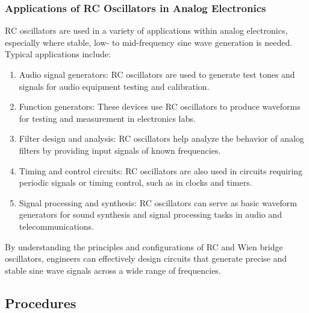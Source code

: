 \documentclass[12pt,a4paper]{article}
\begin{document}
    \subsubsection{Applications of RC Oscillators in Analog Electronics}
    RC oscillators are used in a variety of applications within analog electronics, especially where stable, low- to mid-frequency sine wave generation is needed. Typical applications include:

    \begin{enumerate}
        \item Audio signal generators: RC oscillators are used to generate test tones and signals for audio equipment testing and calibration.
        \item Function generators: These devices use RC oscillators to produce waveforms for testing and measurement in electronics labs.
        \item Filter design and analysis: RC oscillators help analyze the behavior of analog filters by providing input signals of known frequencies.
        \item Timing and control circuits: RC oscillators are also used in circuits requiring periodic signals or timing control, such as in clocks and timers.
        \item Signal processing and synthesis: RC oscillators can serve as basic waveform generators for sound synthesis and signal processing tasks in audio and telecommunications.
    \end{enumerate}


    By understanding the principles and configurations of RC and Wien bridge oscillators, engineers can effectively design circuits that generate precise and stable sine wave signals across a wide range of frequencies.

    \subsection{Procedures}
\end{document}
